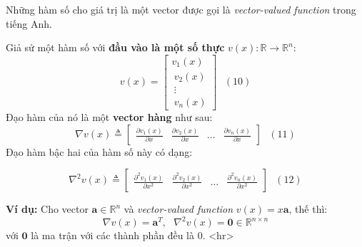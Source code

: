Những hàm số cho giá trị là một vector được gọi là \textit{vector-valued function} trong tiếng Anh.  
 
Giả sử một hàm số với \textbf{đầu vào là một số thực} $v(x): \mathbb{R} \rightarrow \mathbb{R}^n $: 
\begin{equation*} 
v(x) =  
\left[ 
\begin{matrix} 
    v_1(x) \\\ 
    v_2(x) \\\ 
    \vdots \\\ 
    v_n(x) 
\end{matrix} 
\right] ~~~ (10) 
\end{equation*} 
Đạo hàm của nó là một \textbf{vector hàng} như sau:  
\begin{equation*} 
\nabla v(x) \triangleq  
\left[ 
\begin{matrix} 
    \frac{\partial v_1(x)}{\partial x} & \frac{\partial v_2(x)}{\partial x} & \dots & \frac{\partial v_n(x)}{\partial x} 
\end{matrix} 
\right] ~~~ (11) 
\end{equation*} 
Đạo hàm bậc hai của hàm số này có dạng: 
 
\begin{equation*} 
\nabla^2 v(x) \triangleq  
\left[ 
\begin{matrix} 
    \frac{\partial^2 v_1(x)}{\partial x^2} & \frac{\partial^2 v_2(x)}{\partial x^2} & \dots & \frac{\partial^2 v_n(x)}{\partial x^2} 
\end{matrix} 
\right] ~~~(12) 
\end{equation*} 
 
\textbf{Ví dụ:} Cho vector $\mathbf{a} \in \mathbb{R}^n$ và \textit{vector-valued function} $v(x) = x\mathbf{a}$, thế thì: 
\begin{equation*} 
\nabla v(x) = \mathbf{a}^T, ~~~ \nabla^2 v(x) = \mathbf{0} \in \mathbb{R}^{n\times n} 
\end{equation*} 
với $\mathbf{0}$ là ma trận với các thành phần đều là 0.  
<hr> 
 
